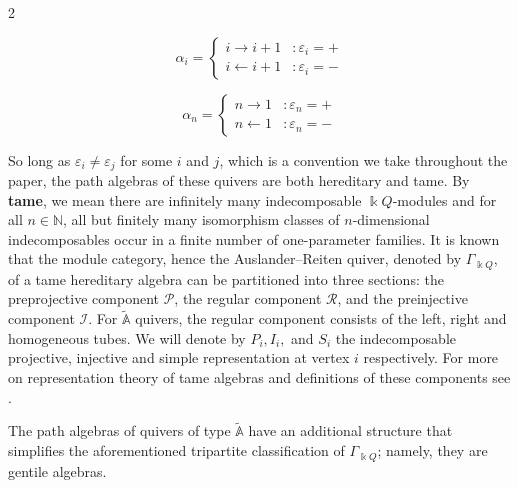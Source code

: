 \documentclass[12pt]{amsart}
\theoremstyle{plain}
\theoremstyle{definition}
\theoremstyle{remark}
\begin{document}
\vspace{-.7cm}


\begin{center}
\begin{multicols}{2}

 \begin{displaymath}
   \alpha_i = \left\{
     \begin{array}{lr}
       i \rightarrow i+1 & : \varepsilon_i = +\\
       i \leftarrow i+1 & :  \varepsilon_i = -
     \end{array}
   \right.
\end{displaymath}

\columnbreak

 \begin{displaymath}
   \alpha_n = \left\{
     \begin{array}{lr}
       n \rightarrow 1 & : \varepsilon_n = +\\
       n \leftarrow 1 & :  \varepsilon_n = -
     \end{array}
   \right.
\end{displaymath}


\end{multicols}
\end{center}


So long as $\varepsilon_i \neq \varepsilon_j$ for some $i$ and $j$, which is a convention we take throughout the paper, the path algebras of these quivers are both hereditary and tame. 
By \textbf{tame}, we mean there are infinitely many indecomposable $\Bbbk Q$-modules and for all $n\in\mathbb{N}$, all but finitely many isomorphism classes of $n$-dimensional indecomposables occur in a finite number of one-parameter families. It is known that the module category, hence the Auslander--Reiten quiver, denoted by $\Gamma_{\Bbbk Q}$, of a tame hereditary algebra can be partitioned into three sections: {the preprojective component $\mathcal{P}$, the regular component $\mathcal{R}$, and the preinjective component $\mathcal{I}$.} For $\mathbb{\tilde{A}}$ quivers, the regular component consists of the left, right and homogeneous tubes. We will denote by $P_i, I_i,$ and $S_i$ the indecomposable projective, injective and simple representation at vertex $i$ respectively. For more on representation theory of tame algebras and definitions of these components see \cite{bluebook2}. 

The path algebras of quivers of type $\tilde{\mathbb{A}}$ have an additional structure that simplifies the aforementioned tripartite classification of $\Gamma_{\Bbbk Q}$; namely, they are gentile algebras. 
\end{document}
